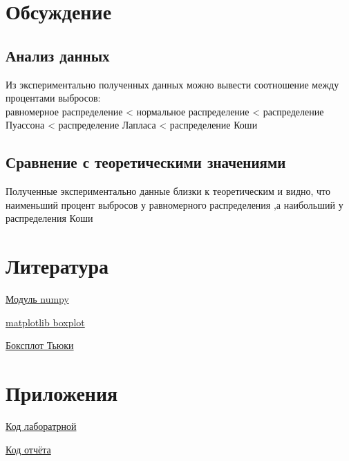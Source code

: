 \documentclass[a4]{article}
\begin{document}
	\newpage
	\section{Обсуждение}
		\subsection{Анализ данных}
		Из экспериментально полученных данных можно вывести соотношение между процентами выбросов:\\
		равномерное распределение < нормальное распределение < распределение Пуассона < распределение Лапласа < распределение Коши
		\subsection{Сравнение с теоретическими значениями}
		Полученные экспериментально данные близки к теоретическим и видно, что наименьший процент выбросов у равномерного распределения ,а наибольший у распределения Коши
	
	\section{Литература}
	
	\href{https://physics.susu.ru/vorontsov/language/numpy.html}{Модуль numpy}
	
	\href{https://matplotlib.org/3.1.1/api/_as_gen/matplotlib.pyplot.boxplot.html}{matplotlib boxplot}
	
	\href{https://habr.com/ru/post/267123/}{Боксплот Тьюки}
	
	\section{Приложения}
	
	\href{https://github.com/LuciusGen/Matstat/blob/master/Lab3/lab3.py}{Код лаборатрной}
	
	\href{https://github.com/LuciusGen/Matstat/blob/master/Lab3/lab3.tex}{Код отчёта}
	
\end{document}
